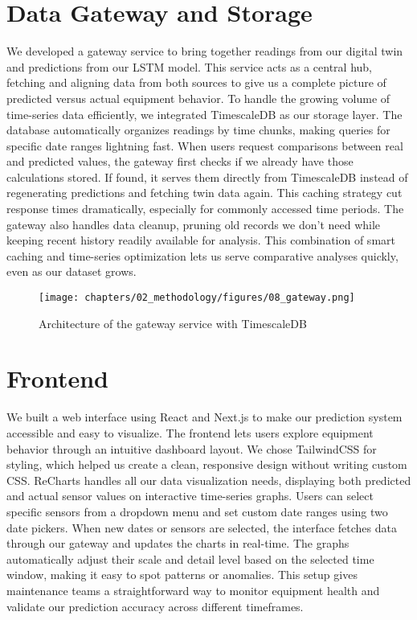 \section{Data Gateway and Storage}
We developed a gateway service to bring together readings from our digital twin and predictions from our LSTM model. This service acts as a central hub, fetching and aligning data from both sources to give us a complete picture of predicted versus actual equipment behavior. To handle the growing volume of time-series data efficiently, we integrated TimescaleDB as our storage layer. The database automatically organizes readings by time chunks, making queries for specific date ranges lightning fast. When users request comparisons between real and predicted values, the gateway first checks if we already have those calculations stored. If found, it serves them directly from TimescaleDB instead of regenerating predictions and fetching twin data again. This caching strategy cut response times dramatically, especially for commonly accessed time periods. The gateway also handles data cleanup, pruning old records we don't need while keeping recent history readily available for analysis. This combination of smart caching and time-series optimization lets us serve comparative analyses quickly, even as our dataset grows.

\begin{figure}[H]
    \centering
    \texttt{[image: chapters/02\_methodology/figures/08\_gateway.png]}
    \caption{Architecture of the gateway service with TimescaleDB}
\end{figure}

\section{Frontend}
We built a web interface using React and Next.js to make our prediction system accessible and easy to visualize. The frontend lets users explore equipment behavior through an intuitive dashboard layout. We chose TailwindCSS for styling, which helped us create a clean, responsive design without writing custom CSS. ReCharts handles all our data visualization needs, displaying both predicted and actual sensor values on interactive time-series graphs. Users can select specific sensors from a dropdown menu and set custom date ranges using two date pickers. When new dates or sensors are selected, the interface fetches data through our gateway and updates the charts in real-time. The graphs automatically adjust their scale and detail level based on the selected time window, making it easy to spot patterns or anomalies. This setup gives maintenance teams a straightforward way to monitor equipment health and validate our prediction accuracy across different timeframes.

